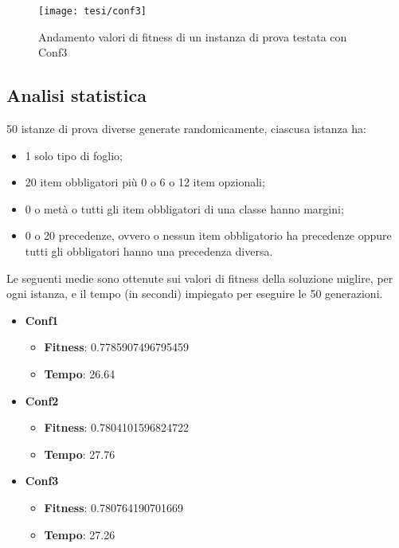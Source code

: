 \begin{figure}[!ht] 
    \centering 
    \texttt{[image: tesi/conf3]} 
    \caption{Andamento valori di fitness di un instanza di prova testata con Conf3}
\end{figure}

\subsection{Analisi statistica} \hypertarget{ttest}{}

50 istanze di prova diverse generate randomicamente, ciascusa istanza ha:
\begin{itemize}
	\item 1 solo tipo di foglio;
	\item 20 item obbligatori più 0 o 6 o 12 item opzionali;
	\item 0 o metà o tutti gli item obbligatori di una classe hanno margini;
	\item 0 o 20 precedenze, ovvero o nessun item obbligatorio ha precedenze oppure tutti gli obbligatori hanno una precedenza diversa.
\end{itemize}

Le seguenti medie sono ottenute sui valori di fitness della soluzione miglire, per ogni istanza, e il tempo (in secondi) impiegato per eseguire le 50 generazioni.

\begin{itemize}
    \item \textbf{Conf1}
    \begin{itemize}
        \item\textbf{Fitness}: 0.7785907496795459
        \item\textbf{Tempo}: 26.64 
    \end{itemize}
    \item \textbf{Conf2}
    \begin{itemize}
        \item\textbf{Fitness}: 0.7804101596824722
        \item\textbf{Tempo}: 27.76
    \end{itemize}
    \item \textbf{Conf3}
    \begin{itemize}
        \item\textbf{Fitness}: 0.780764190701669
        \item\textbf{Tempo}: 27.26
    \end{itemize}
\end{itemize}

